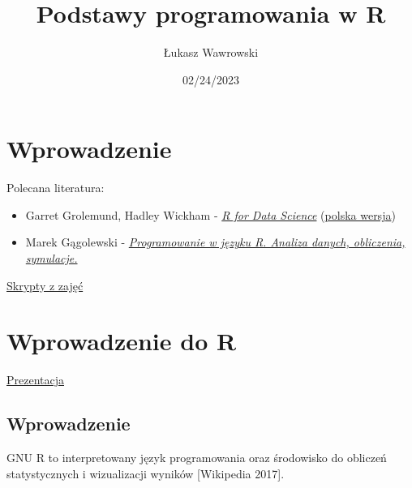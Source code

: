 \documentclass[
  letterpaper,
  DIV=11,
  numbers=noendperiod]{scrreprt}
\title{Podstawy programowania w R}
\author{Łukasz Wawrowski}
\date{02/24/2023}
\renewcommand*\contentsname{Table of contents}
\newcommand\contentsname{Table of contents}
\begin{document}
\maketitle
\ifdefined\Shaded\renewenvironment{Shaded}{\begin{tcolorbox}[frame hidden, boxrule=0pt, enhanced, interior hidden, borderline west={3pt}{0pt}{shadecolor}, breakable, sharp corners]}{\end{tcolorbox}}\fi

\renewcommand*\contentsname{Table of contents}
{
\hypersetup{linkcolor=}
\setcounter{tocdepth}{2}
\tableofcontents
}

\hypertarget{wprowadzenie}{%
\chapter*{Wprowadzenie}\label{wprowadzenie}}

Polecana literatura:

\begin{itemize}
\item
  Garret Grolemund, Hadley Wickham -
  \href{http://r4ds.had.co.nz/}{\emph{R for Data Science}}
  (\href{https://helion.pl/ksiazki/jezyk-r-kompletny-zestaw-narzedzi-dla-analitykow-danych-hadley-wickham-garrett-grolemund,jezrko.htm}{polska
  wersja})
\item
  Marek Gągolewski -
  \href{http://www.gagolewski.com/publications/programowanier/}{\emph{Programowanie
  w języku R. Analiza danych, obliczenia, symulacje.}}
\end{itemize}

\href{https://github.com/lwawrowski/cdv_bigdata}{Skrypty z zajęć}


\hypertarget{wprowadzenie-do-r}{%
\chapter{Wprowadzenie do R}\label{wprowadzenie-do-r}}

\href{presentations/01_wprowadzenie.html}{Prezentacja}

\hypertarget{wprowadzenie-1}{%
\section{Wprowadzenie}\label{wprowadzenie-1}}

GNU R to interpretowany język programowania oraz środowisko do obliczeń
statystycznych i wizualizacji wyników {[}Wikipedia 2017{]}.
\end{document}
